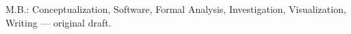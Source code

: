 M.B.: Conceptualization, Software, Formal Analysis,
Investigation, Visualization, Writing --- original draft.
